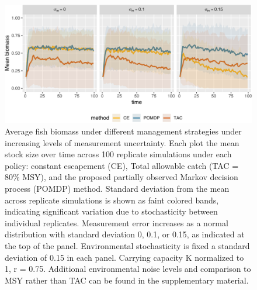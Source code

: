 \documentclass[3p]{elsarticle} %
\makeatletter
\def\maxwidth{\ifdim\Gin@nat@width>\linewidth\linewidth
\else\Gin@nat@width\fi}
\let\Oldincludegraphics\includegraphics
\renewcommand{\includegraphics}[1]{\Oldincludegraphics[width=\maxwidth]{#1}}
\makeatother
\begin{document}
\begin{figure}
\centering
\includegraphics{manuscript_files/figure-latex/sims-1.pdf}
\caption{Average fish biomass under different management strategies
under increasing levels of measurement uncertainty. Each plot the mean
stock size over time across 100 replicate simulations under each policy:
constant escapement (CE), Total allowable catch (TAC = 80\% MSY), and
the proposed partially observed Markov decision process (POMDP) method.
Standard deviation from the mean across replicate simulations is shown
as faint colored bands, indicating significant variation due to
stochasticity between individual replicates. Measurement error increases
as a normal distribution with standard deviation 0, 0.1, or 0.15, as
indicated at the top of the panel. Environmental stochasticity is fixed
a standard deviation of 0.15 in each panel. Carrying capacity K
normalized to 1, r = 0.75. Additional environmental noise levels and
comparison to MSY rather than TAC can be found in the supplementary
material. \label{sims}}
\end{figure}
\end{document}
